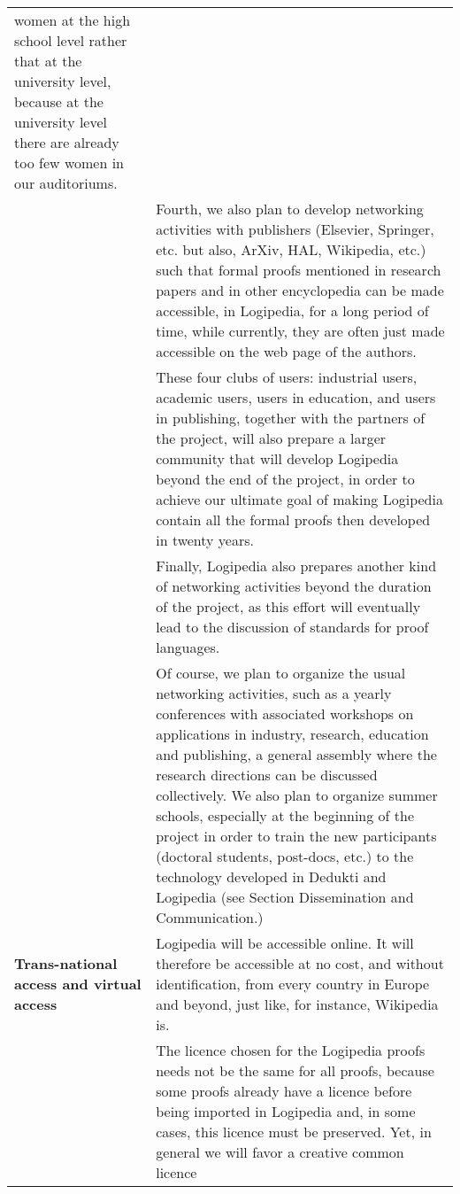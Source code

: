 \begin{longtable}{|p{}|p{}|}
women at the high school level rather that at the university level,
because at the university level there are already too few women in
our auditoriums.\\
&
\hspace{0.4cm}
Fourth, we also plan to develop networking activities with publishers
(Elsevier, Springer, etc. but also, ArXiv, HAL, Wikipedia, etc.)~
such that formal proofs mentioned in research papers and in
other encyclopedia can be made accessible, in Logipedia, for a long
period of time, while currently, they are often just made accessible
on the web page of the authors.\\
&
\hspace{0.4cm}
These four clubs of users: industrial users, academic users, users in 
education, and users in publishing, together with the partners of the 
project, will also
prepare a larger community that will develop Logipedia beyond the end
of the project, in order to achieve our ultimate goal of making
Logipedia contain all the formal proofs then developed in twenty
years.\\
&
\hspace{0.4cm}
Finally, Logipedia also prepares another kind of networking activities
beyond the duration of the project, as this effort will eventually
lead to the discussion of standards for proof languages.\\
&
\hspace{0.4cm}
Of course, we plan to organize the usual networking activities,
such as a yearly conferences with associated workshops on applications
in industry, research, education and publishing, a general assembly
where the research directions can be discussed collectively. We also plan to organize
summer schools, especially at the beginning of the project in order to
train the new participants (doctoral students, post-docs, etc.) to the
technology developed in Dedukti and Logipedia
(see Section Dissemination and Communication.)\\
\hline
{\bf Trans-national access and virtual access}
&
Logipedia will be accessible online. It will therefore be accessible
at no cost, and without identification, from every country in Europe
and beyond, just like, for instance, Wikipedia is.\\
&
\hspace{0.4cm}
The licence chosen for the Logipedia proofs needs not be the same for
all proofs, because some proofs already have a licence before being
imported in Logipedia and, in some cases, this licence must be
preserved.  Yet, in general we will favor a creative common licence

\end{longtable}
